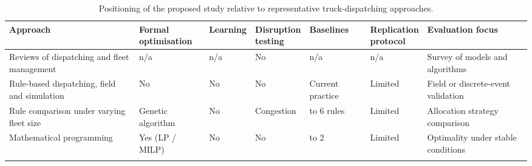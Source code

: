 \documentclass[11pt,a4paper]{article}
\renewcommand{\arraystretch}{1.15} %
\begin{document}
\begin{table}[H]
\centering

\caption{Positioning of the proposed study relative to representative truck-dispatching approaches.}
\label{tab:litterature}

\renewcommand{\arraystretch}{1.35}
\setlength{\tabcolsep}{3.2pt}
\footnotesize

\begin{tabularx}{\textwidth}{
>{\raggedright\arraybackslash}p{3.0cm}
>{\centering\arraybackslash}p{1.9cm}
>{\centering\arraybackslash}p{2.2cm}
>{\centering\arraybackslash}p{1.7cm}
>{\centering\arraybackslash}p{1.6cm}
>{\centering\arraybackslash}p{2.0cm}
>{\raggedright\arraybackslash}X
}

\toprule

\textbf{Approach} &
\makecell{\textbf{Formal}\\\textbf{optimisation}} &
\textbf{Learning} &
\makecell{\textbf{Disruption}\\\textbf{testing}} &
\textbf{Baselines} &
\makecell{\textbf{Replication}\\\textbf{protocol}} &
\textbf{Evaluation focus} \\

\midrule

Reviews of dispatching and fleet management
\cite{AlexandraNewman2010,MohanMunirathinam1994,Alarie2002,Hazrathosseini2024,Afrapoli2017}
&
n/a
&
n/a
&
No
&
n/a
&
n/a
&
Survey of models and algorithms
\\

\addlinespace

Rule-based dispatching, field and simulation
\cite{Subtil2011,MehrnazMohtasham2023,NecmettinCetin2004,MarceloFioroni2008,MiladAbolghasemian2020}
&
No
&
No
&
No
&
Current practice
&
Limited
&
Field or discrete-event validation
\\

\addlinespace

Rule comparison under varying fleet size
\cite{Zeng2022}
&
Genetic algorithm
&
No
&
Congestion
&
4 to 6 rules
&
Limited
&
Allocation strategy comparison
\\

\addlinespace

Mathematical programming
\cite{Soumis1989,Ahangaran2012,ChungTa2013,AmandaSmith2020,ZhongxinWang2022}
&
Yes (LP / MILP)
&
No
&
No
&
0 to 2
&
Limited
&
Optimality under stable conditions
\\

\addlinespace


\end{tabularx}
\end{table}
\end{document}
